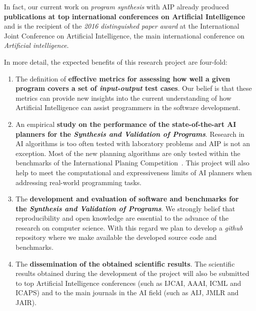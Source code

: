 \documentclass[10pt,a4paper]{paper}
\begin{document}
In fact, our current work on {\em program synthesis} with AIP already produced {\bf publications at top international conferences on Artificial Intelligence}~\cite{segovia2017generating,sergio:aprogramingb:ijcai16,sergio:aprograming:ijcai16,sergio:aprograming:icaps16} and is the recipient of the {\it 2016 distinguished paper award} at the International Joint Conference on Artificial Intelligence, the main international conference on {\em Artificial intelligence}. 

In more detail, the expected benefits of this research project are four-fold:
\begin{enumerate}
\item The definition of {\bf effective metrics for assessing how well a given program covers a set of {\em input-output} test cases}. Our belief is that these metrics can provide new insights into the current understanding of how Artificial Intelligence can assist programmers in the software development. 
\item An empirical {\bf study on the performance of the state-of-the-art AI planners for the {\em Synthesis and Validation of Programs}}. Research in AI algorithms is too often tested with laboratory problems and AIP is not an exception. Most of the new planning algorithms are only tested within the benchmarks of the International Planing Competition~\cite{vallati:IPC:AI15}. This project will also help to meet the computational and expressiveness limits of AI planners when addressing real-world programming tasks. 
\item The {\bf development and evaluation of software and benchmarks for the {\em Synthesis and Validation of Programs}}. We strongly belief that reproducibility and open knowledge are essential to the advance of the research on computer science. With this regard we plan to develop a {\em github} repository where we make available the developed source code and benchmarks.
\item The {\bf dissemination of the obtained scientific results}. The scientific results obtained during the development of the project will also be submitted to top Artificial Intelligence conferences (such as IJCAI, AAAI, ICML and ICAPS) and to the main journals in the AI field (such as AIJ, JMLR and JAIR).
\end{enumerate}

\vspace{0.3cm}

\begin{tiny}

\end{tiny}

\end{document}
